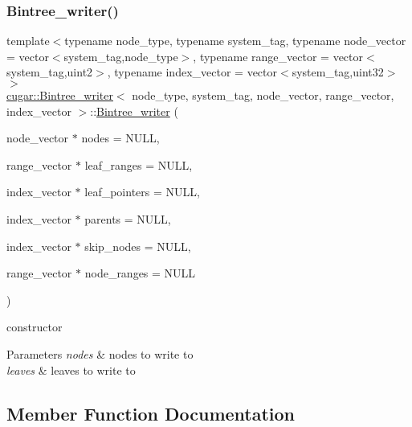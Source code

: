 \subsubsection{\texorpdfstring{Bintree\+\_\+writer()}{Bintree\_writer()}}
{\footnotesize\ttfamily template$<$typename node\+\_\+type, typename system\+\_\+tag, typename node\+\_\+vector = vector$<$system\+\_\+tag,node\+\_\+type$>$, typename range\+\_\+vector = vector$<$system\+\_\+tag,uint2$>$, typename index\+\_\+vector = vector$<$system\+\_\+tag,uint32$>$$>$ \\
\hyperlink{structcugar_1_1_bintree__writer}{cugar\+::\+Bintree\+\_\+writer}$<$ node\+\_\+type, system\+\_\+tag, node\+\_\+vector, range\+\_\+vector, index\+\_\+vector $>$\+::\hyperlink{structcugar_1_1_bintree__writer}{Bintree\+\_\+writer} (\begin{DoxyParamCaption}\item[{node\+\_\+vector $\ast$}]{nodes = {\ttfamily NULL},  }\item[{range\+\_\+vector $\ast$}]{leaf\+\_\+ranges = {\ttfamily NULL},  }\item[{index\+\_\+vector $\ast$}]{leaf\+\_\+pointers = {\ttfamily NULL},  }\item[{index\+\_\+vector $\ast$}]{parents = {\ttfamily NULL},  }\item[{index\+\_\+vector $\ast$}]{skip\+\_\+nodes = {\ttfamily NULL},  }\item[{range\+\_\+vector $\ast$}]{node\+\_\+ranges = {\ttfamily NULL} }\end{DoxyParamCaption})\hspace{0.3cm}{\ttfamily [inline]}}

constructor


\begin{DoxyParams}{Parameters}
{\em nodes} & nodes to write to \\
\hline
{\em leaves} & leaves to write to \\
\hline
\end{DoxyParams}


\subsection{Member Function Documentation}
\mbox{\label{structcugar_1_1_bintree__writer_a90d28ca497d65523760ab584d569d38a}} 
